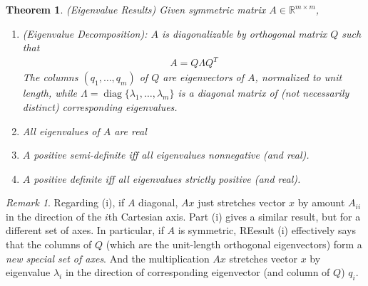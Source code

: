 \documentclass[12pt]{article}
\numberwithin{equation}{section} %
\theoremstyle{plain}
\newtheorem{thm}{Theorem}[section]
\theoremstyle{definition}
\theoremstyle{remark}
\newtheorem*{rmk}{Remark}
\newcommand{\diag}{\operatorname{diag}}
\newcommand{\Rmm}{\mathbb{R}^{m\times m}}
\begin{document}
\begin{thm}\emph{(Eigenvalue Results)}
\label{thm:symmetric-eig}
Given symmetric matrix $A\in\Rmm$,
\begin{enumerate}[label=\emph{(\roman*)}]
  \item
    \emph{(Eigenvalue Decomposition):}
    $A$ is diagonalizable by orthogonal matrix $Q$ such that
    \begin{align*}
      A = Q\Lambda Q^T
    \end{align*}
    The columns $(q_1,\ldots,q_m)$ of $Q$ are eigenvectors of $A$,
    normalized to unit length, while
    $\Lambda=\diag\{\lambda_1,\ldots,\lambda_m\}$ is a diagonal matrix
    of (not necessarily distinct) corresponding eigenvalues.
  \item All eigenvalues of $A$ are \emph{real}
  \item $A$ positive semi-definite iff all eigenvalues nonnegative (and
    real).
  \item $A$ positive definite iff all eigenvalues strictly positive (and
    real).
\end{enumerate}

\end{thm}
\begin{rmk}
Regarding (i),
if $A$ diagonal, $Ax$ just stretches vector $x$ by amount $A_{ii}$ in
the direction of the $i$th Cartesian axis.
Part (i) gives a similar result, but for a different set of axes.  In
particular, if $A$ is symmetric, REesult (i) effectively says that the
columns of $Q$ (which are the unit-length orthogonal eigenvectors) form
a \emph{new special set of axes}. And the multiplication $Ax$ stretches
vector $x$ by eigenvalue $\lambda_i$ in the direction of corresponding
eigenvector (and column of $Q$) $q_i$.
\end{rmk}
\end{document}
